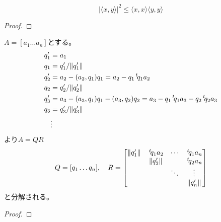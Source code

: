 \documentclass[report]{jlreq}
\begin{document}
\begin{theorem}
    \begin{equation}
        |\langle x, y \rangle|^2 \le \langle x, x \rangle \langle y, y \rangle
    \end{equation}
    \TODO{}
\end{theorem}

\begin{proof}
    \TODO{}
\end{proof}

\begin{definition}[直交系と正規直交系]
    \TODO{}
\end{definition}


\begin{theorem}
    $A = [a_1 \dots a_n]$とする。
    \begin{alignat}{1}
        q'_1 &= a_1 \\
        q_1 &= q'_1 / \| q'_1 \| \\
        q'_2 &= a_2 - (a_2, q_1) q_1
            = a_2 - q_1 \,{}^{t}\!q_1 a_2 \\
        q_2 &= q'_2 / \| q'_2 \| \\
        q'_3 &= a_3 - (a_3, q_1) q_1 - (a_3, q_2) q_2
            = a_3 - q_1 \,{}^{t}\!q_1 a_3 - q_2 \,{}^{t}\!q_2 a_3 \\
        q_3 &= q'_3 / \| q'_3 \| \\
        &\vdots
    \end{alignat}
    より$A = QR$
    \begin{equation}
        Q = [q_1 \dots q_n],
        \quad
        R = \begin{bmatrix}
            \| q'_1 \| & \,{}^{t}\!q_1 a_2 & \cdots & \,{}^{t}\!q_1 a_n \\
            & \| q'_2 \| & & \,{}^{t}\!q_2 a_n \\
            & & \ddots & \vdots \\
            & & & \| q'_n \|
        \end{bmatrix}
    \end{equation}
    と分解される。

\end{theorem}

\begin{proof}
    \TODO{}
\end{proof}
\end{document}
